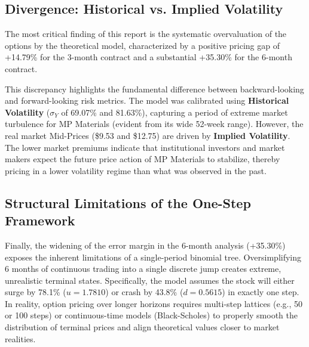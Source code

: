 \documentclass{report}
\begin{document}
\subsection{Divergence: Historical vs. Implied Volatility}
The most critical finding of this report is the systematic overvaluation of the options by the theoretical model, characterized by a positive pricing gap of +14.79\% for the 3-month contract and a substantial +35.30\% for the 6-month contract. 

This discrepancy highlights the fundamental difference between backward-looking and forward-looking risk metrics. The model was calibrated using \textbf{Historical Volatility} ($\sigma_Y$ of 69.07\% and 81.63\%), capturing a period of extreme market turbulence for MP Materials (evident from its wide 52-week range). However, the real market Mid-Prices (\$9.53 and \$12.75) are driven by \textbf{Implied Volatility}. The lower market premiums indicate that institutional investors and market makers expect the future price action of MP Materials to stabilize, thereby pricing in a lower volatility regime than what was observed in the past.

\subsection{Structural Limitations of the One-Step Framework}
Finally, the widening of the error margin in the 6-month analysis (+35.30\%) exposes the inherent limitations of a single-period binomial tree. Oversimplifying 6 months of continuous trading into a single discrete jump creates extreme, unrealistic terminal states. Specifically, the model assumes the stock will either surge by 78.1\% ($u=1.7810$) or crash by 43.8\% ($d=0.5615$) in exactly one step. In reality, option pricing over longer horizons requires multi-step lattices (e.g., 50 or 100 steps) or continuous-time models (Black-Scholes) to properly smooth the distribution of terminal prices and align theoretical values closer to market realities.
\end{document}
